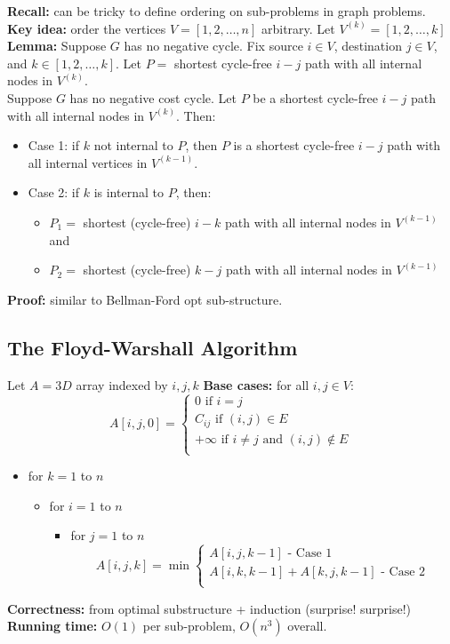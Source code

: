 \documentclass{scrartcl}
\begin{document}
{\bf Recall: } can be tricky to define ordering on sub-problems in graph
problems. \\
{\bf Key idea: } order the vertices $V = [1, 2, \dots, n]$ arbitrary. Let
$V^{(k)} = [1, 2, \dots, k]$ \\
{\bf Lemma: } Suppose $G$ has no negative cycle. Fix source $i \in V$,
destination $j \in V$, and $k \in [1, 2, \dots, k]$. Let $P = $ shortest
cycle-free $i-j$ path with all internal nodes in $V^{(k)}$.\\
Suppose $G$ has no negative cost cycle. Let $P$ be a shortest cycle-free $i-j$
path with all internal nodes in $V^{(k)}$. Then:
\begin{itemize}
\item Case 1: if $k$ not internal to $P$, then $P$ is a shortest cycle-free
  $i-j$ path with all internal vertices in $V^{(k-1)}$.
\item Case 2: if $k$ is internal to $P$, then:
  \begin{itemize}
  \item $P_1 = $ shortest (cycle-free) $i-k$ path with all internal nodes in
    $V^{(k-1)}$ and
  \item $P_2 = $ shortest (cycle-free) $k-j$ path with all internal nodes in
    $V^{(k-1)}$
  \end{itemize}
\end{itemize} {\bf Proof: } similar to Bellman-Ford opt sub-structure.

\subsection{The Floyd-Warshall Algorithm}
\label{sec:15-3}
Let $A = 3D$ array indexed by $i, j, k$ {\bf Base cases: } for all $i, j \in V$:
$$A[i, j, 0] = \left\{\begin{smallmatrix} 0 \text{ if } i = j \\ 
    C_{ij} \text{ if } (i,j) \in E \\
    +\infty \text{ if } i \neq j \text{ and } (i,j) \notin E \\
  \end{smallmatrix} \right.$$
\begin{itemize}
\item for $k = 1$ to $n$
  \begin{itemize} 
  \item for $i = 1$ to $n$
    \begin{itemize} 
    \item for $j = 1$ to $n$
$$A[i, j, k] = \min \left\{
  \begin{smallmatrix}
    A[i, j, k-1] \text{ - Case 1} \\
    A[i, k, k-1] + A[k, j, k-1] \text{ - Case 2} \\
  \end{smallmatrix}
\right. $$
    \end{itemize}
  \end{itemize}
\end{itemize}
{\bf Correctness: } from optimal substructure + induction (surprise! surprise!)
{\bf Running time: } $O(1)$ per sub-problem, $O(n^3)$ overall.
\end{document}
